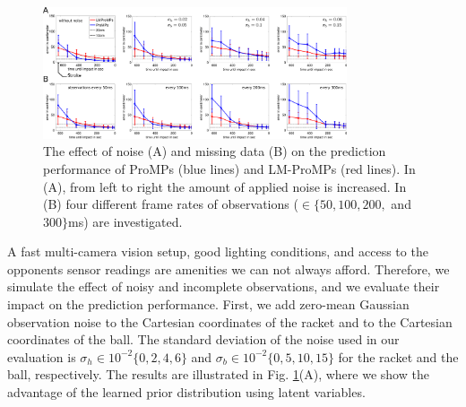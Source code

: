 



\begin{figure}
\begin{center}
\includegraphics[width=0.8\textwidth]{elmarICRA/pics/PingPong_Overfitting.png}
\end{center}
\caption{The effect of noise (A) and missing data (B) on the prediction performance of ProMPs (blue lines) and LM-ProMPs (red lines).  
In (A), from left to right the amount of applied noise is increased. 
In (B) four different frame rates of observations ($\in \{50, 100, 200, $ and $ 300\}$ms) are investigated.
\label{fig:pingpong_overfitting}}
\end{figure}

A fast multi-camera vision setup, good lighting conditions, and access to the
opponents sensor readings are amenities we can not always afford. Therefore, we
simulate the effect of noisy and incomplete observations, and we evaluate their
impact on the prediction performance. First, we add zero-mean Gaussian
observation noise to the Cartesian coordinates of the racket and to the
Cartesian coordinates of the ball. The standard deviation of the noise used in
our evaluation is $\sigma_h \in 10^{-2}\{0, 2, 4, 6\}$ and $\sigma_b \in 10^{-2}\{0, 5, 10, 15\}$
for the racket and the ball, respectively. The results are illustrated in Fig. \ref{fig:pingpong_overfitting}(A), 
where we show the advantage of the learned prior distribution using latent
variables. %
  
